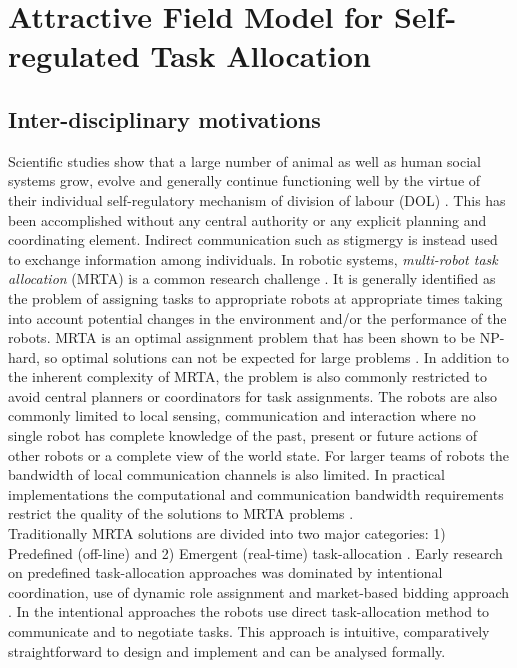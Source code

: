 \chapter{Attractive Field Model for Self-regulated Task Allocation}
\label{afm}
\section{Inter-disciplinary motivations}
Scientific studies show that a large number of animal as well as human social systems grow, evolve and generally continue functioning well by the virtue of their individual self-regulatory mechanism of division of labour (DOL)  \cite{Bonabeau+1999}.
This has been accomplished without any central authority or any explicit planning and coordinating element.
Indirect communication such as stigmergy is instead used to exchange information among individuals. 
In robotic systems, \textit{multi-robot task allocation} (MRTA) is a common research challenge \cite{Gerkey+2004}.
It is generally identified as the problem of assigning tasks to appropriate robots at appropriate times taking into account potential changes in the environment and/or the performance of the robots.
MRTA is an optimal assignment problem that has been shown to be NP-hard, so optimal solutions can not be expected for large problems \cite{Parker2008}.
In addition to the inherent complexity of MRTA, the problem is also commonly restricted to avoid central planners or coordinators for task assignments.
The robots are also commonly limited to local sensing, communication and interaction \cite{Lerman+2006} where no single robot has complete knowledge of the past, present or future actions of other robots or a complete view of the world state.
For larger teams of robots the bandwidth of local communication channels is also limited.
In practical implementations the computational and communication bandwidth requirements restrict the quality of the solutions to MRTA problems \cite{Gerkey+2004,Lerman+2006}.\\
Traditionally MRTA solutions are divided into two major categories: 1) Predefined (off-line) and 2) Emergent (real-time) task-allocation \cite{Shen+2001}. Early research on predefined task-allocation approaches was dominated by intentional coordination, use of dynamic role assignment \cite{Parker2008} and market-based bidding approach \cite{Dias+2006}.
In the intentional approaches the robots use direct task-allocation method to communicate and to negotiate tasks.
This approach is intuitive, comparatively straightforward to design and implement and can be analysed formally.

